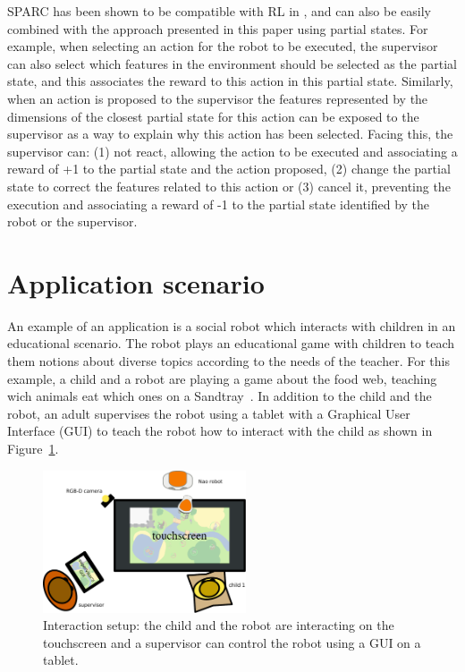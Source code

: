\documentclass[letterpaper]{article} %
\begin{document}
SPARC has been shown to be compatible with RL in \cite{senft2017supervised},
and can also be easily combined with the approach presented in this paper using
partial states. For example, when selecting an action for the robot to be
executed, the supervisor can also select which features in the environment
should be selected as the partial state, and this associates the reward 
to this action in this partial state. Similarly, when an action is
proposed to the supervisor the features represented by the dimensions of the
closest partial state for this action can be exposed to the supervisor as a way to explain why
this action has been selected. Facing this, the supervisor can: (1) not react,
allowing the action to be executed and associating a reward of +1 to the partial
state and the action proposed, (2) change the partial state to correct the features
related to this action or (3) cancel it, preventing the execution and associating a
reward of -1 to the partial state identified by the robot or the supervisor. 

\section{Application scenario}


An example of an application is a social robot which interacts with children in an educational scenario.
The robot plays an educational game with children to teach them notions about
diverse topics according to the needs of the teacher. For this example, a child
and a robot are playing a game about the food web, teaching wich animals eat which
ones on a Sandtray~\cite{baxter2012touchscreen}. In addition to the child and
the robot, an adult supervises the robot using a tablet with a Graphical User
Interface (GUI) to teach the robot how to interact with the child as shown in
Figure~\ref{fig:setup}.

\begin{figure}
        \centering
  \includegraphics[width=60mm]{./figs/setup} 
    \caption{Interaction setup: the child and the robot are interacting on the
    touchscreen and a supervisor can control the robot using a GUI on a tablet.}
        \label{fig:setup}
\end{figure}
\end{document}
